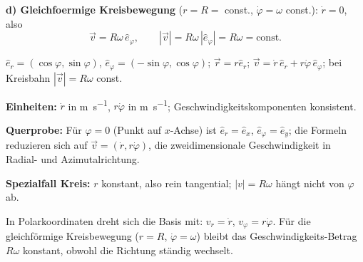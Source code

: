 \textbf{d) Gleichfoermige Kreisbewegung} ($r=R=$ const., $\dot\varphi=\omega$ const.):
$\dot r=0$, also
\begin{equation}
  \vec v=R\omega\,\hat e_\varphi,\qquad
  |\vec v|=R\omega\,|\hat e_\varphi|=R\omega=\text{const.}
\end{equation}

\begin{ergebnis}
$\hat e_r=(\cos\varphi,\sin\varphi)$, $\hat e_\varphi=(-\sin\varphi,\cos\varphi)$;
$\vec r=r\hat e_r$; $\vec v=\dot r\,\hat e_r+r\dot\varphi\,\hat e_\varphi$;
bei Kreisbahn $|\vec v|=R\omega$ const.
\end{ergebnis}

\begin{kontrolle}
\textbf{Einheiten:} $\dot r$ in \unit{\metre\per\second},
$r\dot\varphi$ in \unit{\metre\per\second}; Geschwindigkeitskomponenten
konsistent. \checkmark

\textbf{Querprobe:} Für $\varphi=0$ (Punkt auf $x$-Achse) ist
$\hat e_r=\hat e_x$, $\hat e_\varphi=\hat e_y$; die Formeln reduzieren sich
auf $\vec v=(\dot r,r\dot\varphi)$, die zweidimensionale Geschwindigkeit in
Radial- und Azimutalrichtung. \checkmark

\textbf{Spezialfall Kreis:} $r$ konstant, also rein tangential;
$|v|=R\omega$ hängt nicht von $\varphi$ ab. \checkmark
\end{kontrolle}

\begin{merksatz}
In Polarkoordinaten dreht sich die Basis mit: $v_r=\dot r$, $v_\varphi=r\dot\varphi$.
Für die gleichförmige Kreisbewegung ($r=R$, $\dot\varphi=\omega$) bleibt
das Geschwindigkeits-Betrag $R\omega$ konstant, obwohl die Richtung ständig
wechselt.
\end{merksatz}
